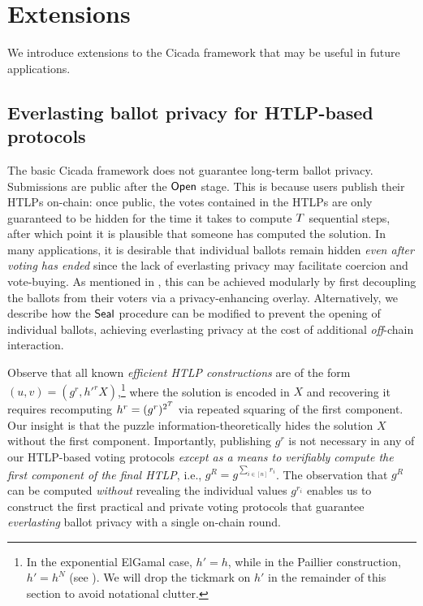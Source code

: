 \section{Extensions}\label{sec:cicada_extensions}
We introduce extensions to the Cicada framework that may be useful in future applications.

\subsection{Everlasting ballot privacy for HTLP-based protocols}\label{sec:everlasting_ballot_privacy}



The basic Cicada framework does not guarantee long-term ballot privacy. Submissions are public after the $\mathsf{Open}$ stage. This is because users publish their HTLPs on-chain: once public, the votes contained in the HTLPs are only guaranteed to be hidden for the time it takes to compute $T$ sequential steps, after which point it is plausible that someone has computed the solution. In many applications, it is desirable that individual ballots remain hidden \emph{even after voting has ended} since the lack of everlasting privacy may facilitate coercion and vote-buying. As mentioned in , this can be achieved modularly by first decoupling the ballots from their voters via a privacy-enhancing overlay. Alternatively, we describe how the $\mathsf{Seal}$ procedure can be modified to prevent the opening of individual ballots, achieving everlasting privacy at the cost of additional \emph{off}-chain interaction.

Observe that all known \emph{efficient HTLP constructions} are of the form $(u,v) = (g^r, {h'}^r X)$,\footnote{In the exponential ElGamal case, $h' = h$, while in the Paillier construction, $h' = h^N$ (see ). We will drop the tickmark on $h'$ in the remainder of this section to avoid notational clutter.} where the solution is encoded in $X$ and recovering it requires recomputing $h^r=(g^{r})^{2^{T}}$ via repeated squaring of the first component. Our insight is that the puzzle information-theoretically hides the solution $X$ without the first component. Importantly, publishing $g^r$ is not necessary in any of our HTLP-based voting protocols \emph{except as a means to verifiably compute the first component of the final HTLP}, i.e., $g^{R}=g^{\sum_{i\in[n]} r_i}$. The observation that $g^R$ can be computed \emph{without} revealing the individual values $g^{r_i}$ enables us to construct the first practical and private voting protocols that guarantee \emph{everlasting} ballot privacy with a single on-chain round.

